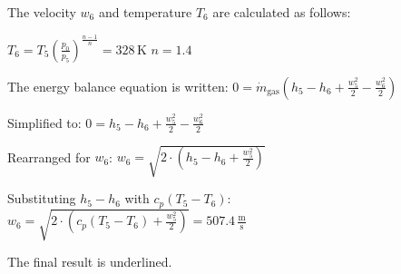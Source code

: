The velocity \( w_6 \) and temperature \( T_6 \) are calculated as follows:  

\( T_6 = T_5 \left( \frac{p_0}{p_5} \right)^{\frac{n-1}{n}} = 328 \, \text{K} \)  
\( n = 1.4 \)  

The energy balance equation is written:  
\( 0 = \dot{m}_{\text{gas}} \left( h_5 - h_6 + \frac{w_5^2}{2} - \frac{w_6^2}{2} \right) \)  

Simplified to:  
\( 0 = h_5 - h_6 + \frac{w_5^2}{2} - \frac{w_6^2}{2} \)  

Rearranged for \( w_6 \):  
\( w_6 = \sqrt{2 \cdot \left( h_5 - h_6 + \frac{w_5^2}{2} \right)} \)  

Substituting \( h_5 - h_6 \) with \( c_p (T_5 - T_6) \):  
\( w_6 = \sqrt{2 \cdot \left( c_p (T_5 - T_6) + \frac{w_5^2}{2} \right)} = 507.4 \, \frac{\text{m}}{\text{s}} \)  

The final result is underlined.
